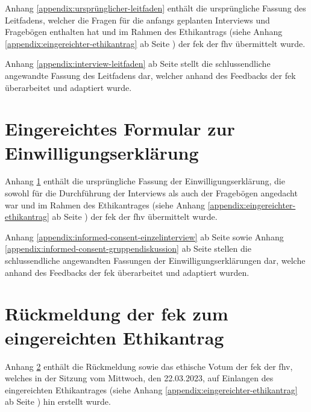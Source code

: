 \documentclass[a4paper,12pt,twoside]{scrreprt}
\begin{document}
Anhang \ref{appendix:ursprünglicher-leitfaden} enthält die ursprüngliche Fassung des Leitfadens, welcher die Fragen für die anfangs geplanten Interviews und Fragebögen enthalten hat und im Rahmen des Ethikantrags (siehe Anhang \ref{appendix:eingereichter-ethikantrag} ab Seite \pageref{appendix:eingereichter-ethikantrag}) der \acl{fek} der \acl{fhv} übermittelt wurde.

\medskip

Anhang \ref{appendix:interview-leitfaden} ab Seite \pageref{appendix:interview-leitfaden} stellt die schlussendliche angewandte Fassung des Leitfadens dar, welcher anhand des Feedbacks der \ac{fek} überarbeitet und adaptiert wurde.



\cleardoublepage
\chapter{Eingereichtes Formular zur Einwilligungserklärung}
\label{appendix:ursprüngliches-informed-consent-formular}

Anhang \ref{appendix:ursprüngliches-informed-consent-formular} enthält die ursprüngliche Fassung der Einwilligungserklärung, die sowohl für die Durchführung der Interviews als auch der Fragebögen angedacht war und im Rahmen des Ethikantrages (siehe Anhang \ref{appendix:eingereichter-ethikantrag} ab Seite \pageref{appendix:eingereichter-ethikantrag}) der \acl{fek} der \acl{fhv} übermittelt wurde.

\medskip

Anhang \ref{appendix:informed-consent-einzelinterview} ab Seite \pageref{appendix:informed-consent-einzelinterview} sowie Anhang \ref{appendix:informed-consent-gruppendiskussion} ab Seite \pageref{appendix:informed-consent-gruppendiskussion} stellen die schlussendliche angewandten Fassungen der Einwilligungserklärungen dar, welche anhand des Feedbacks der \ac{fek} überarbeitet und adaptiert wurden.



\cleardoublepage
\chapter{Rückmeldung der \acl{fek} zum eingereichten Ethikantrag}
\label{appendix:rückmeldung-fek}

Anhang \ref{appendix:rückmeldung-fek} enthält die Rückmeldung sowie das ethische Votum der \acl{fek} der \acl{fhv}, welches in der Sitzung vom Mittwoch, den 22.03.2023, auf Einlangen des eingereichten Ethikantrages (siehe Anhang \ref{appendix:eingereichter-ethikantrag} ab Seite \pageref{appendix:eingereichter-ethikantrag}) hin erstellt wurde.
\end{document}
